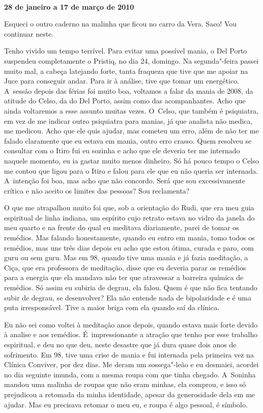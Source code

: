  

​

\begin{flushright}\textbf{28 de janeiro a 17 de março de 2010}\end{flushright}


Esqueci o outro caderno na malinha que ficou no carro da Vera. Saco! Vou
continuar neste.

Tenho vivido um tempo terrível. Para evitar uma possível mania, o Del
Porto suspendeu completamente o Pristiq, no dia 24, domingo. Na
segunda"-feira passei muito mal, a cabeça latejando forte, tanta fraqueza
que tive que me apoiar na Juce para conseguir andar. Para ir à análise,
tive que tomar um energético. A~sessão depois das férias foi muito boa,
voltamos a falar da mania de 2008, da atitude do Celso, da do Del Porto,
assim como das acompanhantes. Acho que ainda voltaremos a esse assunto
muitas vezes. O~Celso, que também é psiquiatra, em vez de me indicar
outro psiquiatra para manias, já que analista não medica, me medicou.
Acho que ele quis ajudar, mas cometeu um erro, além de não ter me falado
claramente que eu estava em mania, outro erro crasso. Quem resolveu se
consultar com o Itiro fui eu sozinha e acho que ele deveria ter me
internado naquele momento, eu ia gastar muito menos dinheiro. Só há
pouco tempo o Celso me contou que ligou para o Itiro e falou para ele
que eu não queria ser internada. A~intenção foi boa, mas acho que não
concordo. Será que sou excessivamente crítica e não aceito os limites
das pessoas? Sou reclamenta?

O que me atrapalhou muito foi que, sob a orientação do Rudi, que era meu
guia espiritual de linha indiana, um espírito cujo retrato estava no
vidro da janela do meu quarto e na frente do qual eu meditava
diariamente, parei de tomar os remédios. Mas falando honestamente,
quando eu entro em mania, tomo todos os remédios, mas uns três dias
depois eu acho que estou ótima, curada e paro, com guru ou sem guru. Mas
em 98, quando tive uma mania e já fazia meditação, a Ciça, que era
professora de meditação, disse que eu deveria parar os remédios para a
energia que ela mandava não ter que atravessar a barreira química de
remédios. Só assim eu subiria de degrau, ela falou. Quem é que não fica
tentando subir de degrau, se desenvolver? Ela não entende nada de
bipolaridade e é uma puta irresponsável. Tive a maior briga com ela
quando saí da clínica.

Eu não sei como voltei à meditação anos depois, quando estava mais forte
devido à analise e aos remédios. É~impressionante a atração que tenho
por esse trabalho espiritual, e deu no que deu, neste desastre que já
dura quase dois anos de sofrimento. Em 98, tive uma crise de mania e fui
internada pela primeira vez na Clínica Conviver, por dez dias. Me deram
um sossega"-leão e eu desmaiei, acordei no dia seguinte imunda, com a
mesma roupa com que tinha chegado. A~Soninha mandou uma malinha de roupas
que não eram minhas, ela comprou, e isso só prejudicou a retomada da
minha identidade, apesar da generosidade dela em me ajudar. Mas eu
precisava retomar o meu eu, e roupa é algo pessoal, é símbolo.

